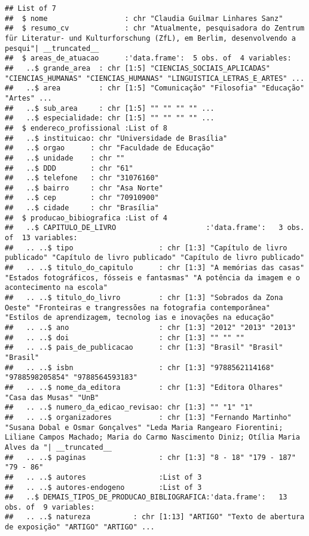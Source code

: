 \documentclass[]{article}
\begin{document}
\begin{verbatim}
## List of 7
##  $ nome                  : chr "Claudia Guilmar Linhares Sanz"
##  $ resumo_cv             : chr "Atualmente, pesquisadora do Zentrum für Literatur- und Kulturforschung (ZfL), em Berlim, desenvolvendo a pesqui"| __truncated__
##  $ areas_de_atuacao      :'data.frame':  5 obs. of  4 variables:
##   ..$ grande_area  : chr [1:5] "CIENCIAS_SOCIAIS_APLICADAS" "CIENCIAS_HUMANAS" "CIENCIAS_HUMANAS" "LINGUISTICA_LETRAS_E_ARTES" ...
##   ..$ area         : chr [1:5] "Comunicação" "Filosofia" "Educação" "Artes" ...
##   ..$ sub_area     : chr [1:5] "" "" "" "" ...
##   ..$ especialidade: chr [1:5] "" "" "" "" ...
##  $ endereco_profissional :List of 8
##   ..$ instituicao: chr "Universidade de Brasília"
##   ..$ orgao      : chr "Faculdade de Educação"
##   ..$ unidade    : chr ""
##   ..$ DDD        : chr "61"
##   ..$ telefone   : chr "31076160"
##   ..$ bairro     : chr "Asa Norte"
##   ..$ cep        : chr "70910900"
##   ..$ cidade     : chr "Brasília"
##  $ producao_bibiografica :List of 4
##   ..$ CAPITULO_DE_LIVRO                     :'data.frame':   3 obs. of  13 variables:
##   .. ..$ tipo                    : chr [1:3] "Capítulo de livro publicado" "Capítulo de livro publicado" "Capítulo de livro publicado"
##   .. ..$ titulo_do_capitulo      : chr [1:3] "A memórias das casas" "Estados fotográficos, fósseis e fantasmas" "A potência da imagem e o acontecimento na escola"
##   .. ..$ titulo_do_livro         : chr [1:3] "Sobrados da Zona Oeste" "Fronteiras e trangressões na fotografia contemporânea" "Estilos de aprendizagem, tecnolog ias e inovações na educação"
##   .. ..$ ano                     : chr [1:3] "2012" "2013" "2013"
##   .. ..$ doi                     : chr [1:3] "" "" ""
##   .. ..$ pais_de_publicacao      : chr [1:3] "Brasil" "Brasil" "Brasil"
##   .. ..$ isbn                    : chr [1:3] "9788562114168" "9788598205854" "9788564593183"
##   .. ..$ nome_da_editora         : chr [1:3] "Editora Olhares" "Casa das Musas" "UnB"
##   .. ..$ numero_da_edicao_revisao: chr [1:3] "" "1" "1"
##   .. ..$ organizadores           : chr [1:3] "Fernando Martinho" "Susana Dobal e Osmar Gonçalves" "Leda Maria Rangearo Fiorentini; Liliane Campos Machado; Maria do Carmo Nascimento Diniz; Otília Maria Alves da "| __truncated__
##   .. ..$ paginas                 : chr [1:3] "8 - 18" "179 - 187" "79 - 86"
##   .. ..$ autores                 :List of 3
##   .. ..$ autores-endogeno        :List of 3
##   ..$ DEMAIS_TIPOS_DE_PRODUCAO_BIBLIOGRAFICA:'data.frame':   13 obs. of  9 variables:
##   .. ..$ natureza          : chr [1:13] "ARTIGO" "Texto de abertura de exposição" "ARTIGO" "ARTIGO" ...

\end{verbatim}
\end{document}
